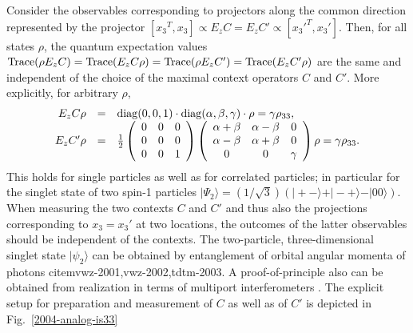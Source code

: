 \documentclass[prl,twocolumn,showpacs,showkeys,amsfonts]{revtex4}
\begin{document}
Consider the observables corresponding to projectors along the common direction
represented by the projector
$[{x_3}^T, {x_3}]\propto E_zC=E_zC' \propto [{x_3'}^T, {x_3'}]$.
Then, for all states $\rho$, the quantum expectation values
$
{\rm Trace} (\rho E_zC) =
{\rm Trace} (E_zC\rho )=
{\rm Trace} (\rho E_zC')=
{\rm Trace} (E_zC'\rho )
$
are the same and independent of the choice of the maximal context operators
$C$ and $C'$.
More explicitly, for arbitrary $\rho$,
\begin{equation}
\begin{array}{rcl}
E_zC\rho &=&
{\rm diag}(0 , 0 , 1 )
\cdot
{\rm diag}(\alpha , \beta , \gamma )
\cdot
\rho
= \gamma \rho_{33},
\\
E_zC'\rho &=&
\frac{1}{2}
\left(
  \begin{array}{ccc}
      0&0 &0 \\
    0&0&0\\
0&0&1
    \end{array}
\right)
\left(
  \begin{array}{ccc}
    \alpha +\beta & \alpha -\beta &0 \\
    \alpha -\beta &\alpha +\beta  &0\\
0&0&\gamma
    \end{array}
\right) \rho = \gamma \rho_{33}.
    \end{array}
\label{2004-qnc-eq1}
\end{equation}
This holds for single particles as well as for correlated particles;
in particular for the singlet state
of two spin-1 particles \cite{mermin80,peres-92}
$
\vert \Psi_2 \rangle
= ({1/ \sqrt{3}})(
\vert + -\rangle
+
\vert - +\rangle
-
\vert 0 0\rangle
)$.
When measuring the two contexts $C$ and $C'$ and thus also
the projections corresponding to $x_3=x_3'$ at two locations,
the outcomes of the latter observables should be independent of the contexts.
The two-particle, three-dimensional singlet state  $\vert \psi_2 \rangle$
can be obtained by entanglement of orbital angular momenta of photons cite{mvwz-2001,vwz-2002,tdtm-2003}.
A proof-of-principle also can be obtained from
realization in terms of multiport interferometers \cite{rzbb,zukowski-97}.
The explicit setup for preparation and measurement \cite{svozil-2004-analog}
of $C$ as well as of $C'$ is depicted in
Fig.~\ref{2004-analog-is33}
\end{document}
